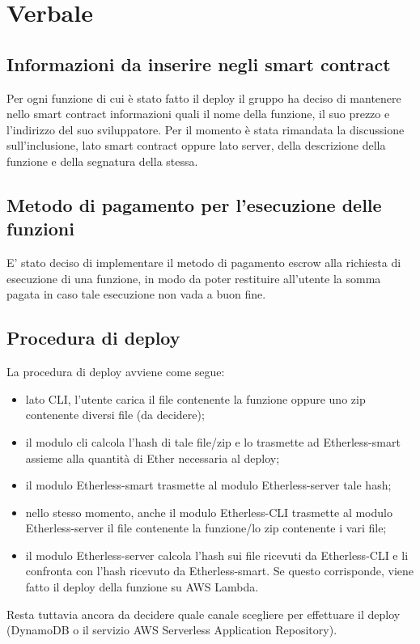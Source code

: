\section{Verbale}

	\subsection{Informazioni da inserire negli smart contract}
	Per ogni funzione di cui è stato fatto il deploy il gruppo ha deciso di mantenere nello smart contract informazioni quali il nome della funzione, il suo prezzo e l'indirizzo del suo sviluppatore. Per il momento è stata rimandata la discussione sull'inclusione, lato smart contract oppure lato server, della descrizione della funzione e della segnatura della stessa.
	
	\subsection{Metodo di pagamento per l'esecuzione delle funzioni}
	E' stato deciso di implementare il metodo di pagamento escrow alla richiesta di esecuzione di una funzione, in modo da poter restituire all'utente la somma pagata in caso tale esecuzione non vada a buon fine.
	
	\subsection{Procedura di deploy}
	La procedura di deploy avviene come segue:
		\begin{itemize}
			\item lato CLI, l'utente carica il file contenente la funzione oppure uno zip contenente diversi file (da decidere);
			\item il modulo cli calcola l'hash di tale file/zip e lo trasmette ad Etherless-smart assieme alla quantità di Ether necessaria al deploy;
			\item il modulo Etherless-smart trasmette al modulo Etherless-server tale hash;
			\item nello stesso momento, anche il modulo Etherless-CLI trasmette al modulo Etherless-server il file contenente la funzione/lo zip contenente i vari file;
			\item il modulo Etherless-server calcola l'hash sui file ricevuti da Etherless-CLI e li confronta con l'hash ricevuto da Etherless-smart. Se questo corrisponde, viene fatto il deploy della funzione su AWS Lambda.	
		\end{itemize}
	Resta tuttavia ancora da decidere quale canale scegliere per effettuare il deploy (DynamoDB o il servizio AWS Serverless Application Repository).
	

